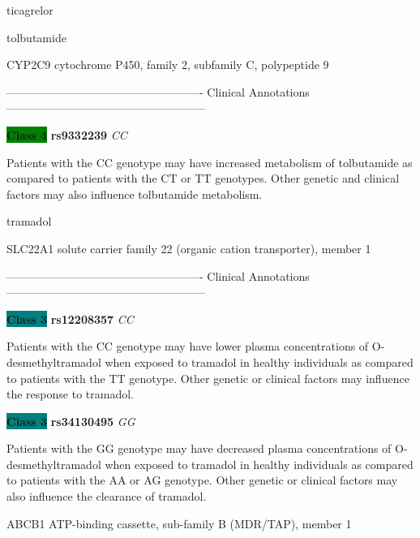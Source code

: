 \documentclass{resume} %
\begin{document}
\begin{rSection}{ ticagrelor }
\end{rSection}\begin{rSection}{ tolbutamide }
\item[]

\begin{rSubsection}{ CYP2C9 }{ cytochrome P450, family 2, subfamily C, polypeptide 9 }{}{}
\item[]

\item[] ---------------------------------------------------- Clinical Annotations -----------------------------------------------------\newline
\item \textbf{\colorbox{green} {Class 4}} \textbf{ rs9332239 } \textit{ CC }
\item[] Patients with the CC genotype may have increased metabolism of tolbutamide as compared to patients with the CT or TT genotypes. Other genetic and clinical factors may also influence tolbutamide metabolism.
\end{rSubsection}

\end{rSection}\begin{rSection}{ tramadol }
\item[]

\begin{rSubsection}{ SLC22A1 }{ solute carrier family 22 (organic cation transporter), member 1 }{}{}
\item[]

\item[] ---------------------------------------------------- Clinical Annotations -----------------------------------------------------\newline
\item \textbf{\colorbox{teal} {Class 3}} \textbf{ rs12208357 } \textit{ CC }
\item[] Patients with the CC genotype may have lower plasma concentrations of O-desmethyltramadol when exposed to tramadol in healthy individuals as compared to patients with the TT genotype. Other genetic or clinical factors may influence the response to tramadol.\item \textbf{\colorbox{teal} {Class 3}} \textbf{ rs34130495 } \textit{ GG }
\item[] Patients with the GG genotype may have decreased plasma concentrations of O-desmethyltramadol when exposed to tramadol in healthy individuals as compared to patients with the AA or AG genotype. Other genetic or clinical factors may also influence the clearance of tramadol.
\end{rSubsection}\begin{rSubsection}{ ABCB1 }{ ATP-binding cassette, sub-family B (MDR/TAP), member 1 }{}{}
\item[]


\end{rSubsection}
\end{rSection}
\end{document}
